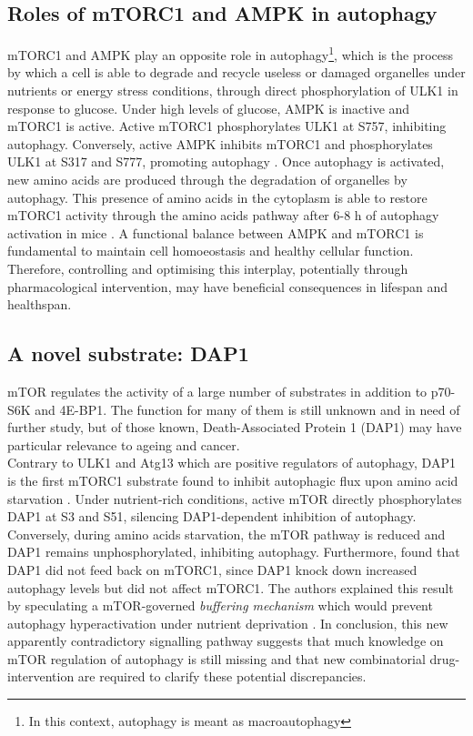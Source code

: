 \subsection{Roles of mTORC1 and AMPK in autophagy}
\label{subsec:Roles of mTORC1 and AMPK in autophagy}
mTORC1 and AMPK play an opposite role in autophagy\footnote{In this context, autophagy is meant as macroautophagy}, which is the process by which a cell is able to degrade and recycle useless or damaged organelles under nutrients or energy stress conditions, through direct phosphorylation of ULK1 \citep{Lee2010, Kim2011} in response to glucose. Under high levels of glucose, AMPK is inactive and mTORC1 is active. Active mTORC1 phosphorylates ULK1 at S757, inhibiting autophagy. Conversely, active AMPK inhibits mTORC1 and phosphorylates ULK1 at S317 and S777, promoting autophagy \citep{Kim2011}. Once autophagy is activated, new amino acids are produced through the degradation of organelles by autophagy. This presence of amino acids in the cytoplasm is able to restore mTORC1 activity through the amino acids pathway after 6-8 h of autophagy activation in mice \citep{Yu2010}. A functional balance between AMPK and mTORC1 is fundamental to maintain cell homoeostasis and healthy cellular function. Therefore, 
controlling and 
optimising this interplay, potentially through pharmacological intervention, may have beneficial consequences in lifespan and healthspan. 

\subsection{A novel substrate: DAP1}
\label{subsec:A novel substrate: DAP1}
mTOR regulates the activity of a large number of substrates in addition to p70-S6K and 4E-BP1. The function for many of them is still unknown and in need of further study, but of those known, Death-Associated Protein 1 (DAP1) may have particular relevance to ageing and cancer. \\
Contrary to ULK1 and Atg13 which are positive regulators of autophagy, DAP1 is the first mTORC1 substrate found to inhibit autophagic flux upon amino acid starvation \citep{Koren2010}. Under nutrient-rich conditions, active mTOR directly phosphorylates DAP1 at S3 and S51, silencing DAP1-dependent inhibition of autophagy. Conversely, during amino acids starvation, the mTOR pathway is reduced and DAP1 remains unphosphorylated, inhibiting autophagy. Furthermore, \citet{Koren2010} found that DAP1 did not feed back on mTORC1, since DAP1 knock down increased autophagy levels but did not affect mTORC1. The authors explained this result by speculating a mTOR-governed \emph{buffering mechanism} which would prevent autophagy hyperactivation under nutrient deprivation \citep{Koren2010}. In conclusion, this new apparently contradictory signalling pathway suggests that much knowledge on mTOR regulation of autophagy is still missing and that new combinatorial drug-intervention are required to clarify these potential 
discrepancies. 


